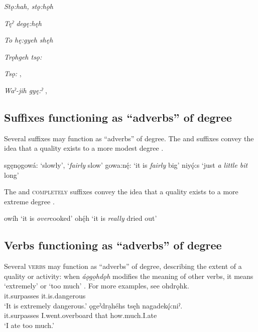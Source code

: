 \begin{CayugaRelated}
\item{} \textit{Stǫ:hah, stǫ:hǫh} 

\item{} \textit{Tęˀ degę:hęh} 

\item{} \textit{To hę:gyeh shęh} 

\item{} \textit{Trǫhgeh tsǫ:} 

\item{} \textit{Tsǫ:} , 

\item{} \textit{Waˀ-jih gyę:ˀ} , 
\end{CayugaRelated}




\subsection{Suffixes functioning as “adverbs” of degree}
Several suffixes may function as “adverbs” of degree. The  and  \textsc{\diminutive} suffixes convey the idea that a quality exists to a more modest degree .

\ea\label{ex:advex31}
\ea sgęnǫgowá: ‘slowly’, ‘\textit{fairly} slow’
\ex gowa:nę́: ‘it is \textit{fairly} big’
\ex niyǫ́:s ‘just \textit{a little bit} long’
\z
\z

The  \textsc{\intensifier} and  \textsc{completely} suffixes convey the idea that a quality exists to a more extreme degree .

\ea\label{ex:advex30}
\ea owíh ‘it is \textit{over}cooked’
\ex ohę́h `it is \textit{really} dried out'\\
\z
\z


\subsection{Verbs functioning as “adverbs” of degree}
Several \textsc{verbs} may function as “adverbs” of degree, describing the extent of a quality or activity: when \textit{áǫgo̱hdǫh} modifies the meaning of other verbs, it means ‘extremely’ or ‘too much’ . For more examples, see 
\ea\label{ex:advex28} 
\ea
 \gll {} ohdrǫhk.\\
it.surpasses it.is.dangerous\\
\glt ‘It is extremely dangerous.’
\ex
 \gll {} ǫgeˀdra̱héhs tsęh nagadekǫ́:niˀ.\\
it.surpasses I.went.overboard that how.much.I.ate\\
\glt ‘I ate too much.’
\z
\z




